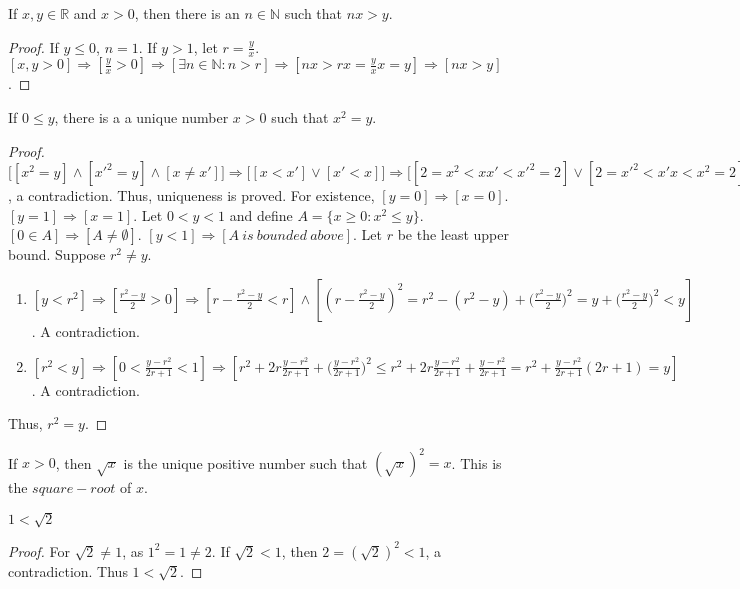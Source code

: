 \documentclass[crop=false,class=article,oneside]{standalone}
\begin{document}
            \begin{corollary}
            If $x,y\in \mathbb{R}$ and $x>0$, then there is an $n\in \mathbb{N}$ such that $nx>y$.
            \end{corollary}
            \begin{proof}
            If $y\leq 0$, $n=1$. If $y>1$, let $r = \frac{y}{x}$. $[x,y>0]\Rightarrow [\frac{y}{x}>0]\Rightarrow [\exists n\in \mathbb{N}:n>r]\Rightarrow [nx > rx = \frac{y}{x}x = y]\Rightarrow[nx>y]$.
            \end{proof}
            \begin{theorem}
            If $0\leq y$, there is a a unique number $x>0$ such that $x^2 = y$.
            \end{theorem}
            \begin{proof}
            $\big[[x^2=y]\land [x'^2=y]\land [x\ne x']\big] \Rightarrow \big[[x<x']\lor[x'<x]\big] \Rightarrow \big[[2=x^2<xx'<x'^2=2]\lor[2=x'^2<x'x<x^2=2]\big]$, a contradiction. Thus, uniqueness is proved. For existence, $[y=0]\Rightarrow[x=0]$.$[y=1]\Rightarrow [x=1]$. Let $0 < y < 1$ and define $A = \{x\geq0:x^2 \leq y\}$. $[0\in A]\Rightarrow[A\ne \emptyset]$. $[y<1]\Rightarrow [A\ is\ bounded\ above]$. Let $r$ be the least upper bound. Suppose $r^2\ne y$.
            \begin{enumerate}
            \item $[y<r^2]\Rightarrow[\frac{r^2-y}{2}>0]\Rightarrow [r-\frac{r^2-y}{2}<r]\land[(r-\frac{r^2-y}{2})^2= r^2 - (r^2-y)+\big(\frac{r^2-y}{2}\big)^2 = y + \big(\frac{r^2-y}{2}\big)^2 < y]$. A contradiction.
            \item $[r^2 <y]\Rightarrow [0<\frac{y-r^2}{2r+1}<1]\Rightarrow [r^2 + 2r\frac{y-r^2}{2r+1}+\big(\frac{y-r^2}{2r+1}\big)^2\leq r^2 + 2r\frac{y-r^2}{2r+1}+\frac{y-r^2}{2r+1} = r^2+\frac{y-r^2}{2r+1}(2r+1)=y]$. A contradiction.
            \end{enumerate}
            Thus, $r^2 = y$.
            \end{proof}
            \begin{definition}
            If $x>0$, then $\sqrt{x}$ is the unique positive number such that $(\sqrt{x})^2 = x$. This is the $square-root$ of $x$.
            \end{definition}
            \begin{corollary}
            $1<\sqrt{2}$
            \end{corollary}
            \begin{proof}
            For $\sqrt{2} \ne 1$, as $1^2 = 1\ne 2$. If $\sqrt{2}<1$, then $2=(\sqrt{2})^2 <1$, a contradiction. Thus $1<\sqrt{2}$.
            \end{proof}
\end{document}

